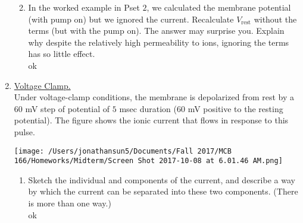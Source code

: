 \documentclass[11pt]{article}
\begin{document}
\begin{enumerate}[label=\arabic*.]
\begin{enumerate}[label=(\alph*)]
\vspace*{1\baselineskip}
\item
In the worked example in Pset $2$, we calculated the membrane potential (with pump on) but we ignored the  current. Recalculate $V_{\text{rest}}$ without the  terms (but with the pump on). The answer may surprise you. Explain why despite the relatively high permeability to  ions, ignoring the  terms has so little effect.
\vspace*{1\baselineskip}
\\
ok









\end{enumerate}























\newpage
\item
\underline{Voltage Clamp.}
\vspace*{1\baselineskip}
\\
Under voltage-clamp conditions, the membrane is depolarized from rest by a $60$ mV step of potential of $5$ msec duration ($60$ mV positive to the resting potential). The figure shows the ionic current that flows in response to this pulse.
\begin{center}
\texttt{[image: /Users/jonathansun5/Documents/Fall 2017/MCB 166/Homeworks/Midterm/Screen Shot 2017-10-08 at 6.01.46 AM.png]}
\end{center}
\begin{enumerate}[label=(\alph*)]
\item
Sketch the individual  and  components of the current, and describe a way by which the current can be separated into these two components. (There is more than one way.)
\vspace*{1\baselineskip}
\\
ok








\end{enumerate}
\end{enumerate}
\end{document}
